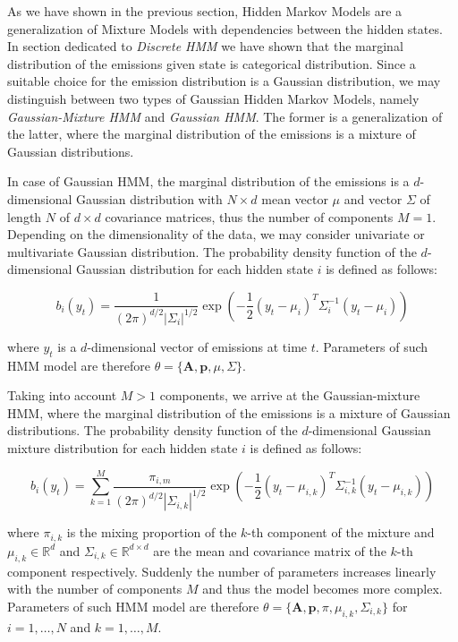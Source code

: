 As we have shown in the previous section, Hidden Markov Models are a generalization of Mixture Models with dependencies between the hidden states.
In section dedicated to \textit{Discrete HMM} we have shown that the marginal distribution of the emissions given state is categorical distribution. 
Since a suitable choice for the emission distribution is a Gaussian distribution, we may distinguish between two types of Gaussian Hidden Markov Models,
namely \textit{Gaussian-Mixture HMM} and \textit{Gaussian HMM}. The former is a generalization of the latter, where the marginal distribution of the emissions is a mixture of Gaussian distributions. \citep{Bishop2006}

In case of Gaussian HMM, the marginal distribution of the emissions is a $d$-dimensional Gaussian distribution with $N \times d$ mean vector $\mu$ and vector $\Sigma$ of length $N$ of $d \times d$ covariance matrices, thus the number of components $M=1$. 
Depending on the dimensionality of the data, we may consider univariate or multivariate Gaussian distribution. The probability density function of the $d$-dimensional Gaussian distribution 
for each hidden state $i$ is defined as follows:

\begin{equation}
    b_i(y_t) = \frac{1}{{(2\pi)}^{d/2}|\Sigma_i|^{1/2}} \exp\left(-\frac{1}{2}{(y_t-\mu_i)}^T\Sigma^{-1}_i(y_t-\mu_i)\right)
\end{equation}

where $y_t$ is a $d$-dimensional vector of emissions at time $t$. Parameters of such HMM model are therefore $\theta = \{\textbf{A},\textbf{p},\mu,\Sigma\}$.

Taking into account $M>1$ components, we arrive at the Gaussian-mixture HMM, where the marginal distribution of the emissions is a mixture of Gaussian distributions. 
The probability density function of the $d$-dimensional Gaussian mixture distribution for each hidden state $i$ is defined as follows:

\begin{equation}
    b_i(y_t) = \sum_{k=1}^{M} \frac{\pi_{i,m}}{{(2\pi)}^{d/2}|\Sigma_{i,k}|^{1/2}} \exp\left(-\frac{1}{2}{(y_t-\mu_{i,k})}^T\Sigma^{-1}_{i,k}(y_t-\mu_{i,k})\right)
\end{equation}

where $\pi_{i,k}$ is the mixing proportion of the $k$-th component of the mixture and $\mu_{i,k} \in \mathbb{R}^d$ and $\Sigma_{i,k} \in \mathbb{R}^{d \times d}$ are the mean and covariance matrix of the $k$-th component respectively. Suddenly the number of parameters
increases linearly with the number of components $M$ and thus the model becomes more complex. Parameters of such HMM model are therefore $\theta = \{\textbf{A},\textbf{p},\pi,\mu_{i,k},\Sigma_{i,k}\}$ for $i=1,\ldots, N$ and $k=1,\ldots, M$.

